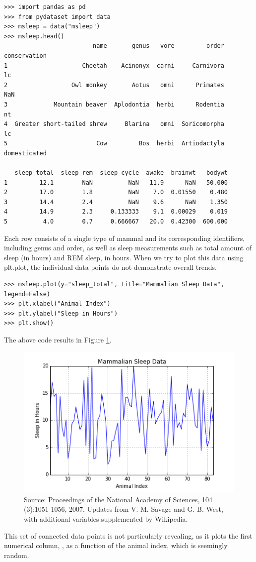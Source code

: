 \begin{lstlisting}
>>> import pandas as pd
>>> from pydataset import data
>>> msleep = data("msleep")
>>> msleep.head()
                         name       genus   vore         order  conservation  
1                     Cheetah    Acinonyx  carni     Carnivora            lc   
2                  Owl monkey       Aotus   omni      Primates           NaN   
3             Mountain beaver  Aplodontia  herbi      Rodentia            nt   
4  Greater short-tailed shrew     Blarina   omni  Soricomorpha            lc   
5                         Cow         Bos  herbi  Artiodactyla  domesticated   

   sleep_total  sleep_rem  sleep_cycle  awake  brainwt   bodywt  
1         12.1        NaN          NaN   11.9      NaN   50.000  
2         17.0        1.8          NaN    7.0  0.01550    0.480  
3         14.4        2.4          NaN    9.6      NaN    1.350  
4         14.9        2.3     0.133333    9.1  0.00029    0.019  
5          4.0        0.7     0.666667   20.0  0.42300  600.000 
\end{lstlisting}

Each row consists of a single type of mammal and its corresponding identifiers, including genus and order, as well as sleep measurements such as total amount of sleep (in hours) and REM sleep, in hours.
When we try to plot this data using plt.plot, the individual data points do not demonstrate overall trends.
\begin{lstlisting}
>>> msleep.plot(y="sleep_total", title="Mammalian Sleep Data", legend=False)
>>> plt.xlabel("Animal Index")
>>> plt.ylabel("Sleep in Hours")
>>> plt.show()
\end{lstlisting}
The above code results in Figure \ref{fig:sleep}.
\begin{figure}[H] 
    \centering
    \includegraphics[width=.75\textwidth]{Msleep1.png}
    \caption{Source:  Proceedings of the National Academy of Sciences, 104 (3):1051-1056, 2007. Updates from V. M. Savage and G. B. West, with additional variables supplemented by Wikipedia.}
    \label{fig:sleep}
\end{figure}
This set of connected data points is not particularly revealing, as it plots the first numerical column, , as a function of the animal index, which is seemingly random.

